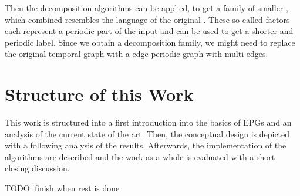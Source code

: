 Then the \DFA decomposition algorithms can be applied, to get a family of smaller \DFAs, which combined resembles the language of the original \DFA. These so called factors each represent a periodic part of the input and can be used to get a shorter and periodic label. Since we obtain a decomposition family, we might need to replace the original temporal graph with a edge periodic graph with multi-edges. 

\section{Structure of this Work}
\label{ch:Intoduction:sec:Structure}
This work is structured into a first introduction into the basics of EPGs and an analysis of the current state of the art. Then, the conceptual design is depicted with a following analysis of the results. Afterwards, the implementation of the algorithms are described and the work as a whole is evaluated with a short closing discussion.  

TODO: finish when rest is done

